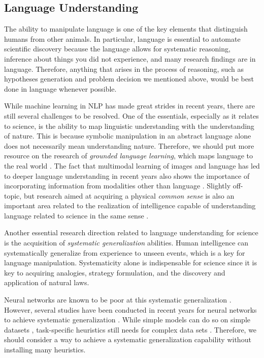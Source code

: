 \documentclass{article}
\begin{document}
\subsection{Language Understanding}
The ability to manipulate language is one of the key elements that distinguish humans from other animals. In particular, language is essential to automate scientific discovery because the language allows for systematic reasoning, inference about things you did not experience, and many research findings are in language. Therefore, anything that arises in the process of reasoning, such as hypotheses generation and problem decision we mentioned above, would be best done in language whenever possible.

While machine learning in NLP has made great strides in recent years, there are still several challenges to be resolved. One of the essentials, especially as it relates to science, is the ability to map linguistic understanding with the understanding of nature. This is because symbolic manipulation in an abstract language alone does not necessarily mean understanding nature. Therefore, we should put more resource on the research of \textit{grounded language learning}, which maps language to the real world \cite{ruis2020benchmark,chevalier2018babyai,colas2022autotelic,lake2021word,mcclelland2020placing}. The fact that multimodal learning of images and language has led to deeper language understanding in recent years also shows the importance of incorporating information from modalities other than language \cite{ramesh2022hierarchical,saharia2022photorealistic}. Slightly off-topic, but research aimed at acquiring a physical \textit{common sense} is also an important area related to the realization of intelligence capable of understanding language related to science in the same sense \cite{sap2020commonsense}.

Another essential research direction related to language understanding for science is the acquisition of \textit{systematic generalization} abilities. Human intelligence can systematically generalize from experience to unseen events, which is a key for language manipulation. Systematicity alone is indispensable for science since it is key to acquiring analogies, strategy formulation, and the discovery and application of natural laws. 

Neural networks are known to be poor at this systematic generalization \cite{fodor1988connectionism}. However, several studies have been conducted in recent years for neural networks to achieve systematic generalization \cite{guo2020hierarchical,guo2021revisiting,gai-etal-2021-grounded-graph,herzig2021unlocking,das-etal-2021-case,zheng-lapata-2022-disentangled,furrer2020compositional,ontanon-etal-2022-making,csordas-etal-2021-devil,liu-etal-2021-learning-algebraic}. While simple models can do so on simple datasets \cite{ontanon-etal-2022-making,csordas-etal-2021-devil}, task-specific heuristics still needs for complex data sets \cite{liu-etal-2021-learning-algebraic}. Therefore, we should consider a way to achieve a systematic generalization capability without installing many heuristics.
\end{document}
